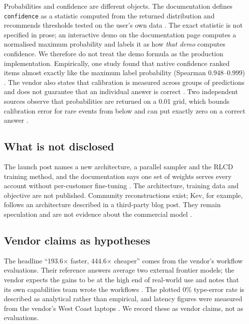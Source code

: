 Probabilities and confidence are different objects. The documentation defines \texttt{confidence} as a statistic computed from the returned distribution and recommends thresholds tested on the user's own data \citep{typesafe2026confidence}. The exact statistic is not specified in prose; an interactive demo on the documentation page computes a normalised maximum probability and labels it as how \emph{that demo} computes confidence. We therefore do not treat the demo formula as the production implementation. Empirically, one study found that native confidence ranked items almost exactly like the maximum label probability (Spearman 0.948–0.999) \citep{arxiv2609_26550}. The vendor also states that calibration is measured across groups of predictions and does not guarantee that an individual answer is correct \citep{typesafe2026systemone}. Two independent sources observe that probabilities are returned on a 0.01 grid, which bounds calibration error for rare events from below and can put exactly zero on a correct answer \citep{arxiv2609_24052,gh_scienthoon_jev_ood_calibration}.

\subsection{What is not disclosed}

The launch post names a new architecture, a parallel sampler and the RLCD training method, and the documentation says one set of weights serves every account without per-customer fine-tuning \citep{typesafe2026launch,typesafe2026models}. The architecture, training data and objective are not published. Community reconstructions exist; Kev, for example, follows an architecture described in a third-party blog post. They remain speculation and are not evidence about the commercial model \citep{gh_jaredpalmer_kev}.

\subsection{Vendor claims as hypotheses}

The headline “193.6× faster, 444.6× cheaper” comes from the vendor's workflow evaluations. Their reference answers average two external frontier models; the vendor expects the gains to be at the high end of real-world use and notes that its own capabilities team wrote the workflows \citep{typesafe2026launch}. The plotted 0\% type-error rate is described as analytical rather than empirical, and latency figures were measured from the vendor's West Coast laptops \citep{typesafe2026launch}. We record these as vendor claims, not as evaluations.

